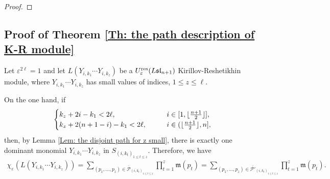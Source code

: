 \documentclass[12pt, reqno]{amsart}
\numberwithin{equation}{section}
\newcommand{\res}{{\rm res}}
\begin{document}
{\begin{proof}
\end{proof}


\subsection{Proof of Theorem \ref{Th: the path description of K-R module}}\label{subsec: prove Th K-R module}

Let $\varepsilon^{2 \ell}=1$ and let $L(Y_{i,k_1}\cdots Y_{i,k_z})$ be a $U_{\varepsilon}^{\res}({L\mathfrak{sl}_{n+1}})$ Kirillov-Reshetikhin module, where $Y_{i,k_1}\cdots Y_{i,k_z}$ has small values of indices, $1\leq z\leq \ell$.

On the one hand, if
\begin{align*}
\begin{cases} k_z+2i-k_1<2 \ell, & {\hskip 2em} i\in [1, \lfloor \frac{n+1}2 \rfloor],\\
              k_z+2(n+1-i)-k_1<2 \ell, & {\hskip 2em} i\in (\lfloor \frac{n+1}2 \rfloor, n],
\end{cases}
\end{align*}
then, by Lemma \ref{Lem: the disjoint path for z small}, there is exactly one dominant monomial $Y_{i,k_1}\cdots Y_{i,k_z}$ in $S_{(i,k_t)_{1 \leq t \leq z}}$. Therefore, we have
\begin{align*}
\chi_{\varepsilon}(L(Y_{i,k_1}\cdots Y_{i,k_z}))=\sum_{(p_{1},\ldots, p_{z}) \in \overline{\mathscr{P}}_{(i,k_t)_{1 \leq t \leq z}}} \prod_{t=1}^{z}\mathfrak{m}(p_{t})=\sum_{(p_{1},\ldots,p_{z}) \in \overline{\mathscr{P'}}_{(i,k_t)_{1 \leq t \leq z}}} \prod_{t=1}^{z}\mathfrak{m}(p_{t}).
\end{align*}

}
\end{document}
